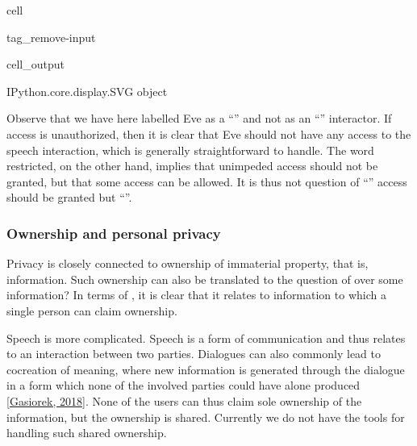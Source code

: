 \documentclass[letterpaper,10pt,english]{jupyterBook}
\begin{document}
\begin{sphinxuseclass}{cell}
\begin{sphinxuseclass}{tag_remove-input}\begin{sphinxVerbatimOutput}

\begin{sphinxuseclass}{cell_output}
\begin{sphinxVerbatim}[commandchars=\\\{\}]
\PYGZlt{}IPython.core.display.SVG object\PYGZgt{}
\end{sphinxVerbatim}

\end{sphinxuseclass}\end{sphinxVerbatimOutput}

\end{sphinxuseclass}
\end{sphinxuseclass}
\sphinxAtStartPar
Observe that we have here labelled Eve as a “” and not as an “” interactor. If access is unauthorized, then it is clear that Eve should not have any access to the speech interaction, which is generally straightforward to handle. The word restricted, on the other hand, implies that unimpeded access should not be granted, but that some access can be allowed. It is thus not question of “” access should be granted but “”.


\subsubsection{Ownership and personal privacy}
\label{\detokenize{Security_and_privacy:ownership-and-personal-privacy}}
\sphinxAtStartPar
Privacy is closely connected to ownership of immaterial property, that is, information. Such ownership can also be translated to the question of  over some information? In terms of , it is clear that it relates to information to which a single person can claim ownership.

\sphinxAtStartPar
Speech is more complicated. Speech is a form of communication and thus relates to an interaction between two parties. Dialogues can also commonly lead to co\sphinxhyphen{}creation of meaning, where new information is generated through the dialogue in a form which none of the involved parties could have alone produced {[}\hyperlink{cite.Security_and_privacy:id44}{Gasiorek, 2018}{]}. None of the users can thus claim sole ownership of the information, but the ownership is shared. Currently we do not have the tools for handling such shared ownership.
\end{document}
